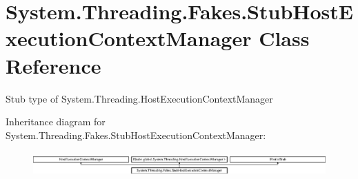 \hypertarget{class_system_1_1_threading_1_1_fakes_1_1_stub_host_execution_context_manager}{\section{System.\-Threading.\-Fakes.\-Stub\-Host\-Execution\-Context\-Manager Class Reference}
\label{class_system_1_1_threading_1_1_fakes_1_1_stub_host_execution_context_manager}
}


Stub type of System.\-Threading.\-Host\-Execution\-Context\-Manager 


Inheritance diagram for System.\-Threading.\-Fakes.\-Stub\-Host\-Execution\-Context\-Manager\-:\begin{figure}[H]
\begin{center}
\leavevmode
\includegraphics[height=0.962199cm]{class_system_1_1_threading_1_1_fakes_1_1_stub_host_execution_context_manager}
\end{center}
\end{figure}
